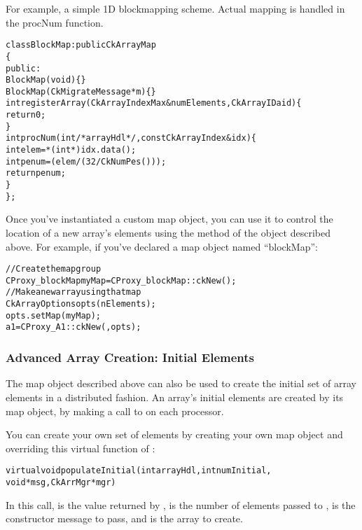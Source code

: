 For example, a simple 1D blockmapping scheme.  Actual mapping is
handled in the procNum function.

\begin{alltt}
class BlockMap : public CkArrayMap 
\{
 public:
  BlockMap(void) \{\}
  BlockMap(CkMigrateMessage *m)\{\}
  int registerArray(CkArrayIndexMax& numElements,CkArrayID aid) \{
    return 0;
  \}
  int procNum(int /*arrayHdl*/,const CkArrayIndex &idx) \{
    int elem=*(int *)idx.data();
    int penum =  (elem/(32/CkNumPes()));
    return penum;
  \}
\};

\end{alltt}
Once you've instantiated a custom map object, you can use it to
control the location of a new array's elements using the
 method of the  object described above.
For example, if you've declared a map object named ``blockMap'':

\begin{alltt}
//Create the map group
  CProxy_blockMap myMap=CProxy_blockMap::ckNew();
//Make a new array using that map
  CkArrayOptions opts(nElements);
  opts.setMap(myMap);
  a1=CProxy_A1::ckNew(,opts);
\end{alltt}



\subsubsection{Advanced Array Creation: Initial Elements}

\label{array initial}

The map object described above can also be used to create
the initial set of array elements in a distributed fashion.
An array's initial elements are created by its map object,
by making a call to  on each processor.

You can create your own set of elements by creating your
own map object and overriding this virtual function of :

\begin{alltt}
  virtual void populateInitial(int arrayHdl,int numInitial,
	void *msg,CkArrMgr *mgr)
\end{alltt}

In this call,  is the value returned by ,
 is the number of elements passed to ,
 is the constructor message to pass, and  is the
array to create.

